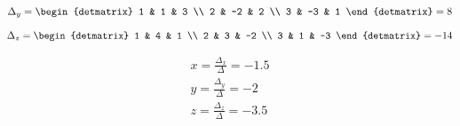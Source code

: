 \documentclass[12pt, a4paper]{article}
\begin{document}
    \begin{equation}
        \Delta_y = \begin{detmatrix}
            1 & 1 & 3 \\
            2 & -2 & 2 \\
            3 & -3 & 1
        \end{detmatrix} = 8
    \end{equation}


    \begin{equation}
        \Delta_z = \begin{detmatrix}
            1 & 4 & 1 \\
            2 & 3 & -2 \\
            3 & 1 & -3
        \end{detmatrix} = -14
    \end{equation}

    \begin{gather}
        x = \frac{\Delta_x}{\Delta} = -1.5 \\
        y = \frac{\Delta_y}{\Delta} = -2 \\
        z = \frac{\Delta_z}{\Delta} = -3.5 \\
    \end{gather}
\end{document}
